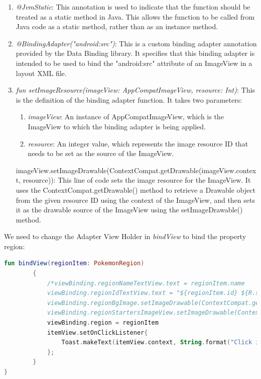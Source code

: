 \documentclass[a4paper, 12pt]{article}
\begin{document}
\begin{enumerate}
    \item \textit{@JvmStatic}: This annotation is used to indicate that the function should be treated as a static method in Java. 
    This allows the function to be called from Java code as a static method, rather than as an instance method.
    \item \textit{@BindingAdapter("android:src")}: This is a custom binding adapter annotation provided by the Data Binding library.
    It specifies that this binding adapter is intended to be used to bind the "android:src" attribute of an ImageView in a layout XML file.
    \item \textit{fun setImageResource(imageView: AppCompatImageView, resource: Int)}: This is the definition of the binding adapter function. It takes two parameters:
    \begin{enumerate}
        \item \textit{imageView}: An instance of AppCompatImageView, which is the ImageView to which the binding adapter is being applied.
        \item \textit{resource}: An integer value, which represents the image resource ID that needs to be set as the source of the ImageView.
    \end{enumerate}
    imageView.setImageDrawable(ContextCompat.getDrawable(imageView.context, resource)): This line of code sets the image resource for the ImageView. 
        It uses the ContextCompat.getDrawable() method to retrieve a Drawable object from the given resource ID using the context of the ImageView,
         and then sets it as the drawable source of the ImageView using the setImageDrawable() method.
\end{enumerate}


We need to change the Adapter View Holder in \textit{bindView} to bind the property region:

\begin{lstlisting}[caption={Binding property Region.}, label={code:binding_region_code}, language=Kotlin]
    fun bindView(regionItem: PokemonRegion)
        {
            /*viewBinding.regionNameTextView.text = regionItem.name
            viewBinding.regionIdTextView.text = "${regionItem.id} ${R.string.pk_generations}".uppercase()
            viewBinding.regionBgImage.setImageDrawable(ContextCompat.getDrawable(itemView.context,regionItem.bg))
            viewBinding.regionStartersImageView.setImageDrawable(ContextCompat.getDrawable(itemView.context,regionItem.starters))*/
            viewBinding.region = regionItem
            itemView.setOnClickListener{
                Toast.makeText(itemView.context, String.format("Click in %s Region", regionItem.name), Toast.LENGTH_LONG).show()
            };
        }
}
\end{lstlisting}
\end{document}
